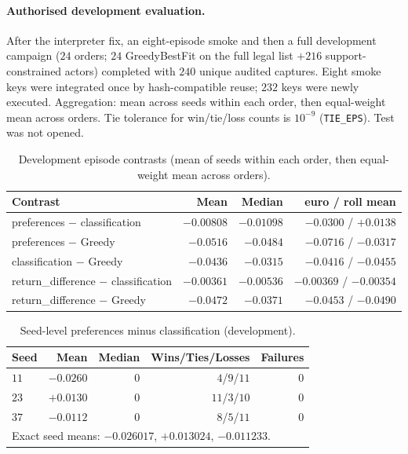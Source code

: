 \paragraph{Authorised development evaluation.}
After the interpreter fix, an eight-episode smoke and then a full development
campaign ($24$ orders; $24$ GreedyBestFit on the full legal list $+216$
support-constrained actors) completed with $240$ unique audited captures. Eight
smoke keys were integrated once by hash-compatible reuse; $232$ keys were newly
executed. Aggregation: mean across seeds within each order, then equal-weight
mean across orders. Tie tolerance for win/tie/loss counts is
$10^{-9}$ (\texttt{TIE\_EPS}). Test was not opened.

\begin{table}[t]
\centering
\caption{Development episode contrasts (mean of seeds within each order, then equal-weight mean across orders).}
\label{tab:dev-contrasts}
\begin{tabular}{lrrr}
\toprule
Contrast & Mean & Median & euro / roll mean \\
\midrule
preferences $-$ classification & $-0.00808$ & $-0.01098$ & $-0.0300$ / $+0.0138$ \\
preferences $-$ Greedy & $-0.0516$ & $-0.0484$ & $-0.0716$ / $-0.0317$ \\
classification $-$ Greedy & $-0.0436$ & $-0.0315$ & $-0.0416$ / $-0.0455$ \\
return\_difference $-$ classification & $-0.00361$ & $-0.00536$ & $-0.00369$ / $-0.00354$ \\
return\_difference $-$ Greedy & $-0.0472$ & $-0.0371$ & $-0.0453$ / $-0.0490$ \\
\bottomrule
\end{tabular}
\end{table}

\begin{table}[t]
\centering
\caption{Seed-level preferences minus classification (development).}
\label{tab:dev-seed-pref-class}
\begin{tabular}{lrrrr}
\toprule
Seed & Mean & Median & Wins/Ties/Losses & Failures \\
\midrule
$11$ & $-0.0260$ & $0$ & $4$/$9$/$11$ & $0$ \\
$23$ & $+0.0130$ & $0$ & $11$/$3$/$10$ & $0$ \\
$37$ & $-0.0112$ & $0$ & $8$/$5$/$11$ & $0$ \\
\multicolumn{5}{l}{\footnotesize Exact seed means: $-0.026017$, $+0.013024$, $-0.011233$.} \\
\bottomrule
\end{tabular}
\end{table}

